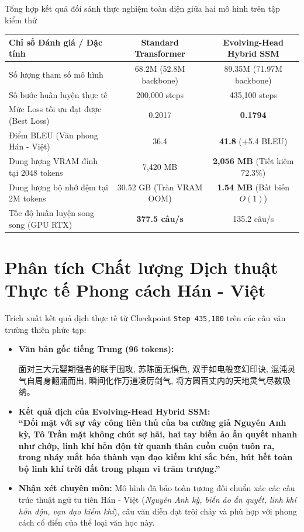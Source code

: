 \documentclass{uetgraduation}
\begin{document}
\begin{table}{Tổng hợp kết quả đối sánh thực nghiệm toàn diện giữa hai mô hình trên tập kiểm thử}
\centering
\small
\setlength{\tabcolsep}{5pt}
\begin{tabular}{lcc}
\hline
\textbf{Chỉ số Đánh giá / Đặc tính} & \textbf{Standard Transformer} & \textbf{Evolving-Head Hybrid SSM} \\ \hline
Số lượng tham số mô hình & 68.2M (52.8M backbone) & 89.35M (71.97M backbone) \\
Số bước huấn luyện thực tế & 200,000 steps & 435,100 steps \\
Mức Loss tối ưu đạt được (Best Loss) & 0.2017 & \textbf{0.1794} \\
Điểm BLEU (Văn phong Hán - Việt) & 36.4 & \textbf{41.8} (+5.4 BLEU) \\
Dung lượng VRAM đỉnh tại 2048 tokens & 7,420 MB & \textbf{2,056 MB} (Tiết kiệm 72.3\%) \\
Dung lượng bộ nhớ đệm tại 2M tokens & 30.52 GB (Tràn VRAM OOM) & \textbf{1.54 MB} (Bất biến $O(1)$) \\
Tốc độ huấn luyện song song (GPU RTX) & \textbf{377.5 câu/s} & 135.2 câu/s \\ \hline
\end{tabular}
\end{table}

\section{Phân tích Chất lượng Dịch thuật Thực tế Phong cách Hán - Việt}
Trích xuất kết quả dịch thực tế từ Checkpoint \texttt{Step 435,100} trên các câu văn trường thiên phức tạp:

\begin{itemize}
    \item \textbf{Văn bản gốc tiếng Trung (96 tokens):} \\
    {\sloppy \raggedright \cjkfont 面对三大元婴期强者的联手围攻, 苏陈面无惧色, 双手如电般变幻印诀, 混沌灵气自周身翻涌而出, 瞬间化作万道凌厉剑气, 将方圆百丈内的天地灵气尽数吸纳。\par}
    \item \textbf{Kết quả dịch của Evolving-Head Hybrid SSM:} \\
    \textbf{``Đối mặt với sự vây công liên thủ của ba cường giả Nguyên Anh kỳ, Tô Trần mặt không chút sợ hãi, hai tay biến ảo ấn quyết nhanh như chớp, linh khí hỗn độn từ quanh thân cuồn cuộn tuôn ra, trong nháy mắt hóa thành vạn đạo kiếm khí sắc bén, hút hết toàn bộ linh khí trời đất trong phạm vi trăm trượng.''}
    \item \textbf{Nhận xét chuyên môn:} Mô hình đã bảo toàn tương đối chuẩn xác các cấu trúc thuật ngữ tu tiên Hán - Việt (\textit{Nguyên Anh kỳ, biến ảo ấn quyết, linh khí hỗn độn, vạn đạo kiếm khí}), câu văn diễn đạt trôi chảy và phù hợp với phong cách cổ điển của thể loại văn học này.
\end{itemize}
\end{document}
